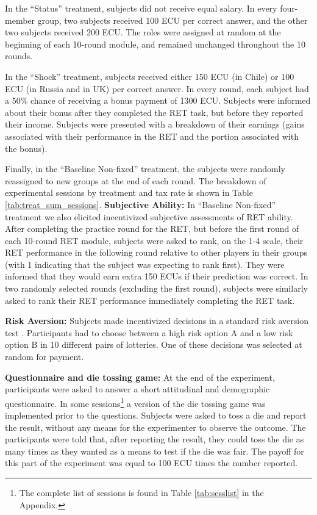 \documentclass[9pt,twocolumn,twoside]{pnas-new}
\begin{document}
In the ``Status'' treatment, subjects did not receive equal salary. In every four-member group, two subjects received 100 ECU per correct answer, and the other two subjects received 200 ECU. The roles were assigned at random at the beginning of each 10-round module, and remained unchanged throughout the 10 rounds. 

In the ``Shock'' treatment, subjects received either 150 ECU (in Chile) or 100 ECU (in Russia and in UK) per correct answer. In every round, each subject had a 50\% chance of receiving a bonus payment of 1300 ECU. Subjects were informed about their bonus after they completed the RET task, but before they reported their income. Subjects were presented with a breakdown of their earnings (gains associated with their performance in the RET and the portion associated with the bonus). 

Finally, in the ``Baseline Non-fixed'' treatment, the subjects were randomly reassigned to new groups at the end of each round. The breakdown of experimental sessions by treatment and tax rate is shown in Table \ref{tab:treat_sum_sessions}.
\textbf{Subjective Ability:} In ``Baseline Non-fixed'' treatment we also elicited incentivized subjective assessments of RET ability. After completing the practice round for the RET, but before the first round of each 10-round RET module, subjects were asked to rank, on the 1-4 scale, their RET performance in the following round relative to other players in their groups (with 1 indicating that the subject was expecting to rank first). They were informed that they would earn extra 150 ECUs if their prediction was correct. In two randomly selected rounds (excluding the first round), subjects were similarly asked to rank their RET performance immediately completing the RET task. 

\textbf{Risk Aversion:} Subjects made incentivized decisions in a standard risk aversion test \citep{Holtetal2002}. Participants had to choose between a high risk option A and a low risk option B in 10 different pairs of lotteries. One of these decisions was selected at random for payment. 

\textbf{Questionnaire and die tossing game:} At the end of the experiment, participants were asked to answer a short attitudinal and demographic questionnaire. In some sessions\footnote{The complete list of sessions is found in Table \ref{tab:sesslist} in the Appendix.}
a version of the \cite{Fischbacheretal2013} die tossing game was implemented prior to the questions. Subjects were asked to toss a die and report the result, without any means for the experimenter to observe the outcome. The participants were told that, after reporting the result, they could toss the die as many times as they wanted as a means to test if the die was fair. The payoff for this part of the experiment was equal to 100 ECU times the number reported. 
\end{document}

